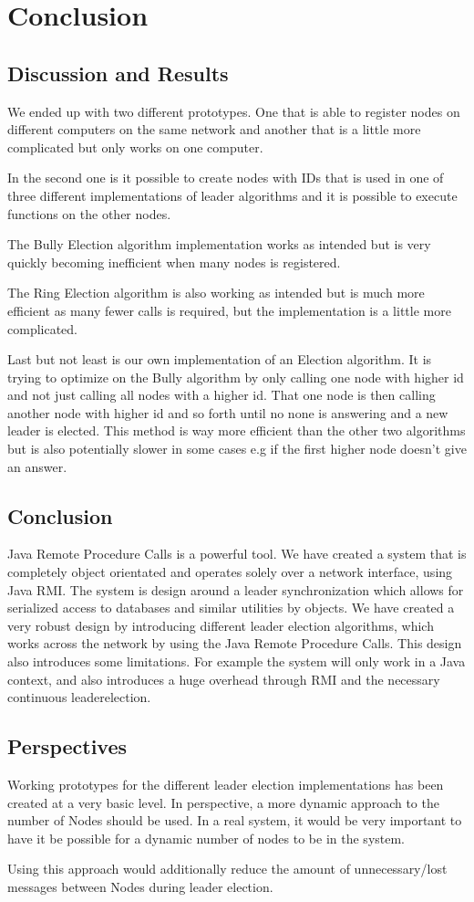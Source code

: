 \chapter{Conclusion}
\section{Discussion and Results}
We ended up with two different prototypes. One that is able to register nodes on different computers on the same network and another that is a little more complicated but only works on one computer.

In the second one is it possible to create nodes with IDs that is used in one of three different implementations of leader algorithms and it is possible to execute functions on the other nodes.

The Bully Election algorithm implementation works as intended but is very quickly becoming inefficient when many nodes is registered.

The Ring Election algorithm is also working as intended but is much more efficient as many fewer calls is required, but the implementation is a little more complicated.

Last but not least is our own implementation of an Election algorithm. It is trying to optimize on the Bully algorithm by only calling one node with higher id and not just calling all nodes with a higher id. That one node is then calling another node with higher id and so forth until no none is answering and a new leader is elected.
This method is way more efficient than the other two algorithms but is also potentially slower in some cases e.g if the first higher node doesn't give an answer.

\section{Conclusion}
Java Remote Procedure Calls is a powerful tool. We have created a system that is completely object orientated and operates solely over a network interface, using Java RMI. The system is design around a leader synchronization which allows for serialized access to databases and similar utilities by objects. We have created a very robust design by introducing different leader election algorithms, which works across the network by using the Java Remote Procedure Calls.
This design also introduces some limitations. For example the system will only work in a Java context, and also introduces a huge overhead through RMI and the necessary continuous leaderelection.


\section{Perspectives}
Working prototypes for the different leader election implementations has been created at a very basic level. In perspective, a more dynamic approach to the number of Nodes should be used. In a real system, it would be very important to have it be possible for a dynamic number of nodes to be in the system. 

Using this approach would additionally reduce the amount of unnecessary/lost messages between Nodes during leader election. 
